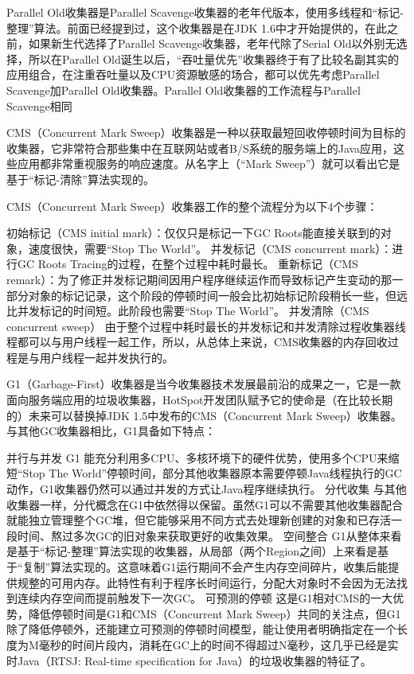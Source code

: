 \documentclass[../../../interview-questions.tex]{subfiles}
\begin{document}
Parallel Old收集器是Parallel Scavenge收集器的老年代版本，使用多线程和“标记-整理”算法。前面已经提到过，这个收集器是在JDK 1.6中才开始提供的，在此之前，如果新生代选择了Parallel Scavenge收集器，老年代除了Serial Old以外别无选择，所以在Parallel Old诞生以后，“吞吐量优先”收集器终于有了比较名副其实的应用组合，在注重吞吐量以及CPU资源敏感的场合，都可以优先考虑Parallel Scavenge加Parallel Old收集器。Parallel Old收集器的工作流程与Parallel Scavenge相同


CMS（Concurrent Mark Sweep）收集器是一种以获取最短回收停顿时间为目标的收集器，它非常符合那些集中在互联网站或者B/S系统的服务端上的Java应用，这些应用都非常重视服务的响应速度。从名字上（“Mark Sweep”）就可以看出它是基于“标记-清除”算法实现的。

CMS（Concurrent Mark Sweep）收集器工作的整个流程分为以下4个步骤：

初始标记（CMS initial mark）：仅仅只是标记一下GC Roots能直接关联到的对象，速度很快，需要“Stop The World”。
并发标记（CMS concurrent mark）：进行GC Roots Tracing的过程，在整个过程中耗时最长。
重新标记（CMS remark）：为了修正并发标记期间因用户程序继续运作而导致标记产生变动的那一部分对象的标记记录，这个阶段的停顿时间一般会比初始标记阶段稍长一些，但远比并发标记的时间短。此阶段也需要“Stop The World”。
并发清除（CMS concurrent sweep）
由于整个过程中耗时最长的并发标记和并发清除过程收集器线程都可以与用户线程一起工作，所以，从总体上来说，CMS收集器的内存回收过程是与用户线程一起并发执行的。

G1（Garbage-First）收集器是当今收集器技术发展最前沿的成果之一，它是一款面向服务端应用的垃圾收集器，HotSpot开发团队赋予它的使命是（在比较长期的）未来可以替换掉JDK 1.5中发布的CMS（Concurrent Mark Sweep）收集器。与其他GC收集器相比，G1具备如下特点：

并行与并发 G1 能充分利用多CPU、多核环境下的硬件优势，使用多个CPU来缩短“Stop The World”停顿时间，部分其他收集器原本需要停顿Java线程执行的GC动作，G1收集器仍然可以通过并发的方式让Java程序继续执行。
分代收集 与其他收集器一样，分代概念在G1中依然得以保留。虽然G1可以不需要其他收集器配合就能独立管理整个GC堆，但它能够采用不同方式去处理新创建的对象和已存活一段时间、熬过多次GC的旧对象来获取更好的收集效果。
空间整合 G1从整体来看是基于“标记-整理”算法实现的收集器，从局部（两个Region之间）上来看是基于“复制”算法实现的。这意味着G1运行期间不会产生内存空间碎片，收集后能提供规整的可用内存。此特性有利于程序长时间运行，分配大对象时不会因为无法找到连续内存空间而提前触发下一次GC。
可预测的停顿 这是G1相对CMS的一大优势，降低停顿时间是G1和CMS（Concurrent Mark Sweep）共同的关注点，但G1除了降低停顿外，还能建立可预测的停顿时间模型，能让使用者明确指定在一个长度为M毫秒的时间片段内，消耗在GC上的时间不得超过N毫秒，这几乎已经是实时Java（RTSJ: Real-time specification for Java）的垃圾收集器的特征了。
\end{document}

